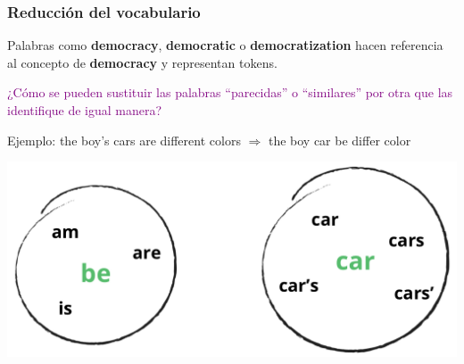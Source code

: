 \documentclass[
10pt, %
aspectratio=169, %
]{beamer}
\begin{document}
	\begin{frame}
		
		\frametitle{Reducción del vocabulario}
		
		Palabras como \textbf{democracy}, \textbf{democratic} o \textbf{democratization} hacen referencia al concepto de \textbf{democracy} y representan tokens.
		
		
		\vspace{2\baselineskip}
		\pause
		\textcolor{purple}{¿Cómo se pueden sustituir las palabras ``parecidas'' o ``similares'' por otra que las identifique de igual manera?}
		
		\pause
		\vspace{1\baselineskip}
		Ejemplo: the boy's cars are different colors $\Rightarrow$ the boy car be differ color
		
		\centering
		\includegraphics[scale=0.45]{lema.png}
		
	\end{frame}
	
	
\end{document}
